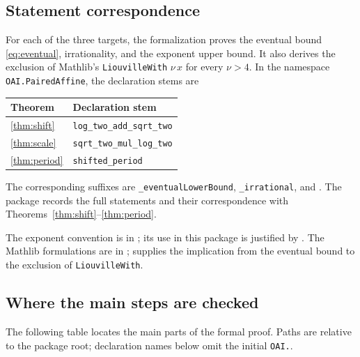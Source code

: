 \documentclass[11pt]{article}
\theoremstyle{definition}
\theoremstyle{remark}
\theoremstyle{plain}
\begin{document}
\subsection{Statement correspondence}
For each of the three targets, the formalization proves the eventual
bound \eqref{eq:eventual}, irrationality, and the exponent upper bound.
It also derives the exclusion of Mathlib's
\texttt{LiouvilleWith} \(\nu\,x\) for every \(\nu>4\).
In the namespace \texttt{OAI.PairedAffine}, the declaration stems are
\begin{center}\small
\begin{tabular}{@{}ll@{}}
\toprule
Theorem & Declaration stem\\
\midrule
\ref{thm:shift} & \texttt{log\_two\_add\_sqrt\_two}\\
\ref{thm:scale} & \texttt{sqrt\_two\_mul\_log\_two}\\
\ref{thm:period} & \texttt{shifted\_period}\\
\bottomrule
\end{tabular}
\end{center}
The corresponding suffixes are \texttt{\_eventualLowerBound},
\texttt{\_irrational}, and .
The package records the full statements
and their correspondence with Theorems~\ref{thm:shift}--\ref{thm:period}.

The exponent convention is in
; its use in this
package is justified by .
The Mathlib formulations are in ;
 supplies the implication from the eventual
bound to the exclusion of \texttt{LiouvilleWith}.

\subsection{Where the main steps are checked}
The following table locates the main parts of the formal proof. Paths are
relative to the package root; declaration names below omit the initial
\texttt{OAI.}.
\end{document}
